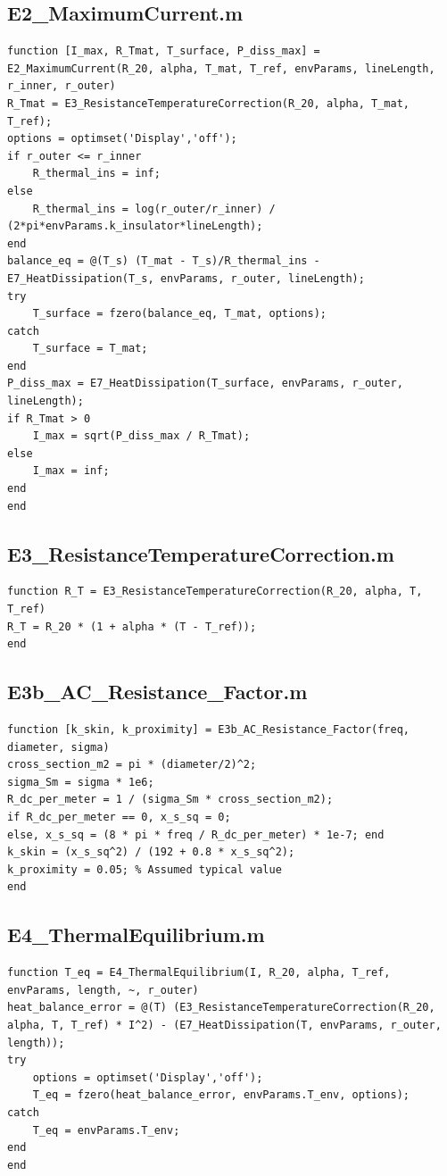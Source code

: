 \documentclass[12pt, a4paper]{article}
\begin{document}
\subsection{E2\_MaximumCurrent.m}
\begin{lstlisting}[caption={Calculates max admissible current based on thermal equilibrium.}, label={lst:E2}]
function [I_max, R_Tmat, T_surface, P_diss_max] = E2_MaximumCurrent(R_20, alpha, T_mat, T_ref, envParams, lineLength, r_inner, r_outer)
R_Tmat = E3_ResistanceTemperatureCorrection(R_20, alpha, T_mat, T_ref);
options = optimset('Display','off');
if r_outer <= r_inner
    R_thermal_ins = inf;
else
    R_thermal_ins = log(r_outer/r_inner) / (2*pi*envParams.k_insulator*lineLength);
end
balance_eq = @(T_s) (T_mat - T_s)/R_thermal_ins - E7_HeatDissipation(T_s, envParams, r_outer, lineLength);
try
    T_surface = fzero(balance_eq, T_mat, options);
catch
    T_surface = T_mat;
end
P_diss_max = E7_HeatDissipation(T_surface, envParams, r_outer, lineLength);
if R_Tmat > 0
    I_max = sqrt(P_diss_max / R_Tmat);
else
    I_max = inf;
end
end
\end{lstlisting}

\subsection{E3\_ResistanceTemperatureCorrection.m}
\begin{lstlisting}[caption={Corrects resistance for operating temperature.}, label={lst:E3}]
function R_T = E3_ResistanceTemperatureCorrection(R_20, alpha, T, T_ref)
R_T = R_20 * (1 + alpha * (T - T_ref));
end
\end{lstlisting}

\subsection{E3b\_AC\_Resistance\_Factor.m}
\begin{lstlisting}[caption={Calculates skin and proximity effect factors.}, label={lst:E3b}]
function [k_skin, k_proximity] = E3b_AC_Resistance_Factor(freq, diameter, sigma)
cross_section_m2 = pi * (diameter/2)^2;
sigma_Sm = sigma * 1e6;
R_dc_per_meter = 1 / (sigma_Sm * cross_section_m2);
if R_dc_per_meter == 0, x_s_sq = 0;
else, x_s_sq = (8 * pi * freq / R_dc_per_meter) * 1e-7; end
k_skin = (x_s_sq^2) / (192 + 0.8 * x_s_sq^2);
k_proximity = 0.05; % Assumed typical value
end
\end{lstlisting}

\subsection{E4\_ThermalEquilibrium.m}
\begin{lstlisting}[caption={Solves for the steady-state temperature of a conductor.}, label={lst:E4}]
function T_eq = E4_ThermalEquilibrium(I, R_20, alpha, T_ref, envParams, length, ~, r_outer)
heat_balance_error = @(T) (E3_ResistanceTemperatureCorrection(R_20, alpha, T, T_ref) * I^2) - (E7_HeatDissipation(T, envParams, r_outer, length));
try
    options = optimset('Display','off');
    T_eq = fzero(heat_balance_error, envParams.T_env, options);
catch
    T_eq = envParams.T_env;
end
end
\end{lstlisting}
\end{document}
